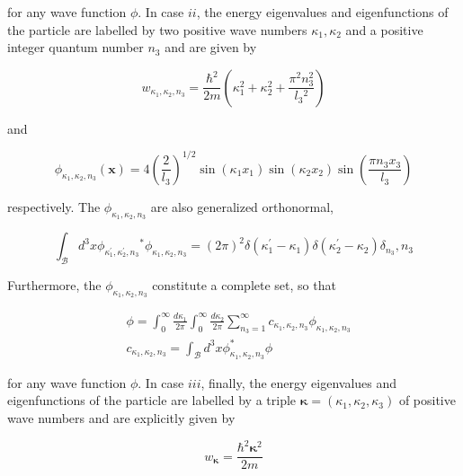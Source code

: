 \documentclass{article}
\begin{document}
for any wave function $\phi$. In case $i i$, the energy eigenvalues and eigenfunctions of the particle are labelled by two positive wave numbers $\kappa_{1}, \kappa_{2}$ and a positive integer quantum number $n_{3}$ and are given by
 
\begin{equation*}
w_{\kappa_{1}, \kappa_{2}, n_{3}}=\frac{\hbar^{2}}{2 m}\left(\kappa_{1}^{2}+\kappa_{2}^{2}+\frac{\pi^{2} n_{3}^{2}}{l_{3}{ }^{2}}\right) \tag{3.15.59}
\end{equation*}
 
and
 
\begin{equation*}
\phi_{\kappa_{1}, \kappa_{2}, n_{3}}(\boldsymbol{x})=4\left(\frac{2}{l_{3}}\right)^{1 / 2} \sin \left(\kappa_{1} x_{1}\right) \sin \left(\kappa_{2} x_{2}\right) \sin \left(\frac{\pi n_{3} x_{3}}{l_{3}}\right) \tag{3.15.60}
\end{equation*}
 
respectively. The $\phi_{\kappa_{1}, \kappa_{2}, n_{3}}$ are also generalized orthonormal,
 
\begin{equation*}
\int_{\mathcal{B}} d^{3} x \phi_{\kappa_{1}^{\prime}, \kappa_{2}^{\prime}, n_{3}}{ }^{*} \phi_{\kappa_{1}, \kappa_{2}, n_{3}}=(2 \pi)^{2} \delta\left(\kappa_{1}^{\prime}-\kappa_{1}\right) \delta\left(\kappa_{2}^{\prime}-\kappa_{2}\right) \delta_{n_{3}}, n_{3} \tag{3.15.61}
\end{equation*}
 

Furthermore, the $\phi_{\kappa_{1}, \kappa_{2}, n_{3}}$ constitute a complete set, so that
 
\begin{align*}
& \phi=\int_{0}^{\infty} \frac{d \kappa_{1}}{2 \pi} \int_{0}^{\infty} \frac{d \kappa_{2}}{2 \pi} \sum_{n_{3}=1}^{\infty} c_{\kappa_{1}, \kappa_{2}, n_{3}} \phi_{\kappa_{1}, \kappa_{2}, n_{3}}  \tag{3.15.62}\\
& c_{\kappa_{1}, \kappa_{2}, n_{3}}=\int_{\mathcal{B}} d^{3} x \phi_{\kappa_{1}, \kappa_{2}, n_{3}}^{*} \phi \tag{3.15.63}
\end{align*}
 
for any wave function $\phi$. In case $i i i$, finally, the energy eigenvalues and eigenfunctions of the particle are labelled by a triple $\boldsymbol{\kappa}=\left(\kappa_{1}, \kappa_{2}, \kappa_{3}\right)$ of positive wave numbers and are explicitly given by
 
\begin{equation*}
w_{\boldsymbol{\kappa}}=\frac{\hbar^{2} \boldsymbol{\kappa}^{2}}{2 m} \tag{3.15.64}
\end{equation*}
 
\end{document}
